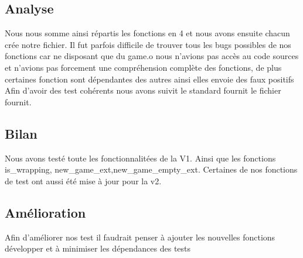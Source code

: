 \documentclass[12pt]{article}
\begin{document}
\subsection{Analyse}
Nous nous somme ainsi répartis les fonctions en 4 et nous avons ensuite chacun crée notre fichier.
Il fut parfois difficile de trouver tous les bugs possibles de nos fonctions car ne disposant que du game.o
nous n'avions pas accès au code sources et n'avions pas forcement une compréhension complète des fonctions, 
de plus certaines fonction sont dépendantes des autres ainsi elles envoie des faux positifs
Afin d'avoir des test cohérents nous avons suivit le standard fournit le fichier fournit.
\subsection{Bilan}
Nous avons testé toute les fonctionnalitées de la V1. Ainsi que les fonctions  is_wrapping, new_game_ext,new_game_empty_ext.
Certaines de nos fonctions de test ont aussi été mise à jour pour la v2.
\subsection{Amélioration}
Afin d'améliorer nos test il faudrait penser à ajouter les nouvelles fonctions développer et à minimiser les dépendances des tests

%
\end{document}
